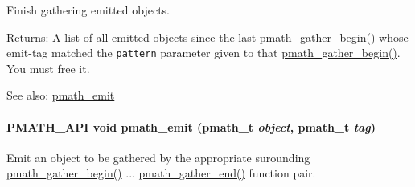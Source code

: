 Finish gathering emitted objects. 

\begin{Desc}
\item[Returns:]A list of all emitted objects since the last \hyperlink{group__helpers_g077f3730ca4275b87d9a35bce6013e45}{pmath\_\-gather\_\-begin()} whose emit-tag matched the {\tt pattern} parameter given to that \hyperlink{group__helpers_g077f3730ca4275b87d9a35bce6013e45}{pmath\_\-gather\_\-begin()}. You must free it.\end{Desc}
\begin{Desc}
\item[See also:]\hyperlink{group__helpers_ga06135012f4d2a0faf696c0cd1111075}{pmath\_\-emit} \end{Desc}
\hypertarget{group__helpers_ga06135012f4d2a0faf696c0cd1111075}{
\paragraph[{pmath\_\-emit}]{\setlength{\rightskip}{0pt plus 5cm}PMATH\_\-API void pmath\_\-emit ({\bf pmath\_\-t} {\em object}, \/  {\bf pmath\_\-t} {\em tag})}\hfill}
\label{group__helpers_ga06135012f4d2a0faf696c0cd1111075}


Emit an object to be gathered by the appropriate surounding \hyperlink{group__helpers_g077f3730ca4275b87d9a35bce6013e45}{pmath\_\-gather\_\-begin()} ... \hyperlink{group__helpers_ga2f732b35703986263e3a15592b4a46e}{pmath\_\-gather\_\-end()} function pair. 

